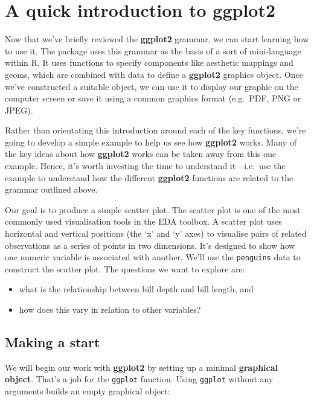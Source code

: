 \documentclass[
]{book}
\providecommand{\tightlist}{%
  \setlength{\itemsep}{0pt}\setlength{\parskip}{0pt}}
\begin{document}
\hypertarget{quick}{%
\section{A quick introduction to ggplot2}\label{quick}}

Now that we've briefly reviewed the \textbf{ggplot2} grammar, we can start learning how to use it. The package uses this grammar as the basis of a sort of mini-language within R. It uses functions to specify components like aesthetic mappings and geoms, which are combined with data to define a \textbf{ggplot2} graphics object. Once we've constructed a suitable object, we can use it to display our graphic on the computer screen or save it using a common graphics format (e.g.~PDF, PNG or JPEG).

Rather than orientating this introduction around each of the key functions, we're going to develop a simple example to help us see how \textbf{ggplot2} works. Many of the key ideas about how \textbf{ggplot2} works can be taken away from this one example. Hence, it's worth investing the time to understand it---i.e.~use the example to understand how the different \textbf{ggplot2} functions are related to the grammar outlined above.

Our goal is to produce a simple scatter plot. The scatter plot is one of the most commonly used visualisation tools in the EDA toolbox. A scatter plot uses horizontal and vertical positions (the `x' and `y' axes) to visualise pairs of related observations as a series of points in two dimensions. It's designed to show how one numeric variable is associated with another. We'll use the \texttt{penguins} data to construct the scatter plot. The questions we want to explore are:

\begin{itemize}
\tightlist
\item
  what is the relationship between bill depth and bill length, and
\item
  how does this vary in relation to other variables?
\end{itemize}

\hypertarget{making-a-start}{%
\subsection{Making a start}\label{making-a-start}}

We will begin our work with \textbf{ggplot2} by setting up a minimal \textbf{graphical object}. That's a job for the \texttt{ggplot} function. Using \texttt{ggplot} without any arguments builds an empty graphical object:
\end{document}

